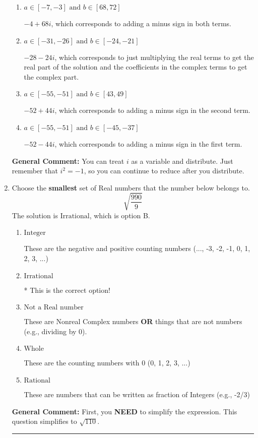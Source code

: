 \documentclass{extbook}[14pt]
\newcommand{\litem}[1]{\item #1

\rule{\textwidth}{0.4pt}}
\begin{document}
\begin{enumerate}
{\begin{enumerate}[label=\Alph*.]
* $-4 - 68 i$, which is the correct option.
\item \( a \in [-7, -3] \text{ and } b \in [68, 72] \)

 $-4 + 68 i$, which corresponds to adding a minus sign in both terms.
\item \( a \in [-31, -26] \text{ and } b \in [-24, -21] \)

 $-28 - 24 i$, which corresponds to just multiplying the real terms to get the real part of the solution and the coefficients in the complex terms to get the complex part.
\item \( a \in [-55, -51] \text{ and } b \in [43, 49] \)

 $-52 + 44 i$, which corresponds to adding a minus sign in the second term.
\item \( a \in [-55, -51] \text{ and } b \in [-45, -37] \)

 $-52 - 44 i$, which corresponds to adding a minus sign in the first term.
\end{enumerate}

\textbf{General Comment:} You can treat $i$ as a variable and distribute. Just remember that $i^2=-1$, so you can continue to reduce after you distribute.
}
\litem{
Choose the \textbf{smallest} set of Real numbers that the number below belongs to.
\[ \sqrt{\frac{990}{9}} \]The solution is \( \text{Irrational} \), which is option B.\begin{enumerate}[label=\Alph*.]
\item \( \text{Integer} \)

These are the negative and positive counting numbers (..., -3, -2, -1, 0, 1, 2, 3, ...)
\item \( \text{Irrational} \)

* This is the correct option!
\item \( \text{Not a Real number} \)

These are Nonreal Complex numbers \textbf{OR} things that are not numbers (e.g., dividing by 0).
\item \( \text{Whole} \)

These are the counting numbers with 0 (0, 1, 2, 3, ...)
\item \( \text{Rational} \)

These are numbers that can be written as fraction of Integers (e.g., -2/3)
\end{enumerate}

\textbf{General Comment:} First, you \textbf{NEED} to simplify the expression. This question simplifies to $\sqrt{110}$. 
 
}
\end{enumerate}
\end{document}
